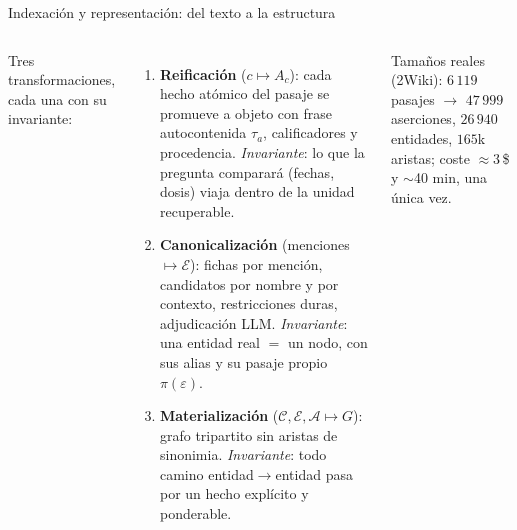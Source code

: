 \documentclass[aspectratio=169,10pt]{beamer}
\begin{document}
\begin{frame}{Indexación y representación: del texto a la estructura}
\begin{columns}[T]
\footnotesize
Tres transformaciones, cada una con su invariante:
\begin{enumerate}\footnotesize
\item \textbf{Reificación} ($c \mapsto A_c$): cada hecho atómico del pasaje se
  promueve a objeto con frase autocontenida $\tau_a$, calificadores y
  procedencia. \emph{Invariante}: lo que la pregunta comparará (fechas, dosis)
  viaja dentro de la unidad recuperable.
\item \textbf{Canonicalización} (menciones $\mapsto \mathcal E$): fichas por
  mención, candidatos por nombre y por contexto, restricciones duras,
  adjudicación LLM. \emph{Invariante}: una entidad real $=$ un nodo,
  con sus alias y su pasaje propio $\pi(\varepsilon)$.
\item \textbf{Materialización} ($\mathcal C,\mathcal E,\mathcal A \mapsto G$):
  grafo tripartito sin aristas de sinonimia. \emph{Invariante}: todo camino
  entidad$\to$entidad pasa por un hecho explícito y ponderable.
\end{enumerate}
Tamaños reales (2Wiki): $6\,119$ pasajes $\to$ $47\,999$ aserciones,
$26\,940$ entidades, $165$k aristas; coste $\approx 3$\,\$ y $\sim$40 min,
una única vez.
\centering
{}
\end{columns}
\end{frame}
\end{document}
